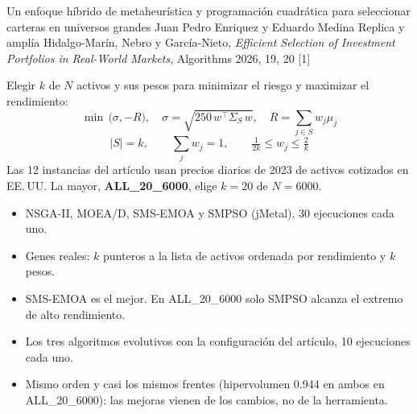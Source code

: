


\color{ink}
  {Un enfoque híbrido de metaheurística y programación cuadrática para seleccionar carteras en universos grandes}
  {Juan Pedro Enriquez y Eduardo Medina}
  {Replica y amplía Hidalgo-Marín, Nebro y García-Nieto, \emph{Efficient Selection of Investment Portfolios in
  Real-World Markets}, Algorithms 2026, 19, 20 [1]}

\hspace*{24mm}%
\begin{minipage}[t]{\colw}\body
  Elegir $k$ de $N$ activos y sus pesos para minimizar el riesgo y maximizar el rendimiento:
  \[
    \min\,\bigl(\sigma,-R\bigr),\quad \sigma=\sqrt{250\,w^{\top}\Sigma_S\,w},\quad R=\textstyle\sum_{j\in S} w_j\mu_j
  \]
  \[
    |S|=k,\qquad \textstyle\sum_j w_j=1,\qquad \tfrac{1}{2k}\le w_j\le\tfrac{2}{k}
  \]
  Las 12 instancias del artículo usan precios diarios de 2023 de activos cotizados en EE.\,UU. La mayor,
  \textbf{ALL\_20\_6000}, elige $k=20$ de $N=6000$.

  \vspace{9mm}
  \begin{itemize}
    \item NSGA-II, MOEA/D, SMS-EMOA y SMPSO (jMetal), 30 ejecuciones cada uno.
    \item Genes reales: $k$ punteros a la lista de activos ordenada por rendimiento y $k$ pesos.
    \item SMS-EMOA es el mejor. En ALL\_20\_6000 solo SMPSO alcanza el extremo de alto rendimiento.
  \end{itemize}

  \vspace{9mm}
  \begin{itemize}
    \item Los tres algoritmos evolutivos con la configuración del artículo, 10 ejecuciones cada uno.
    \item Mismo orden y casi los mismos frentes (hipervolumen 0.944 en ambos en ALL\_20\_6000): las mejoras
    vienen de los cambios, no de la herramienta.
  \end{itemize}
\end{minipage}%
\hspace{\gap}%
